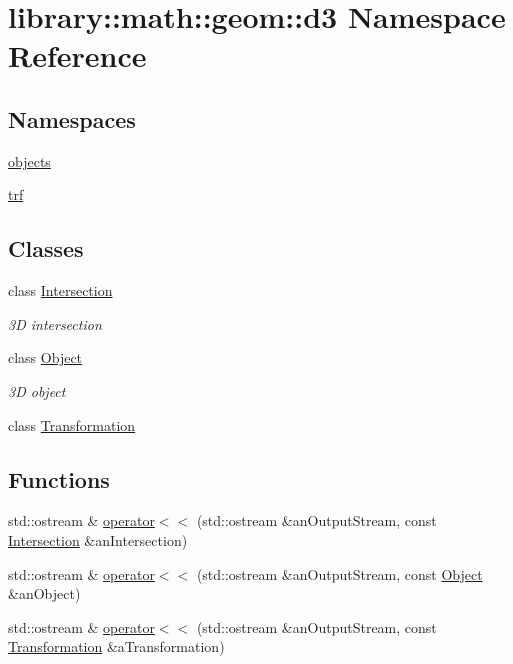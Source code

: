 \hypertarget{namespacelibrary_1_1math_1_1geom_1_1d3}{}\section{library\+:\+:math\+:\+:geom\+:\+:d3 Namespace Reference}
\label{namespacelibrary_1_1math_1_1geom_1_1d3}
\subsection*{Namespaces}
\begin{DoxyCompactItemize}
\item 
 \hyperlink{namespacelibrary_1_1math_1_1geom_1_1d3_1_1objects}{objects}
\item 
 \hyperlink{namespacelibrary_1_1math_1_1geom_1_1d3_1_1trf}{trf}
\end{DoxyCompactItemize}
\subsection*{Classes}
\begin{DoxyCompactItemize}
\item 
class \hyperlink{classlibrary_1_1math_1_1geom_1_1d3_1_1_intersection}{Intersection}
\begin{DoxyCompactList}\small\item\em 3D intersection \end{DoxyCompactList}\item 
class \hyperlink{classlibrary_1_1math_1_1geom_1_1d3_1_1_object}{Object}
\begin{DoxyCompactList}\small\item\em 3D object \end{DoxyCompactList}\item 
class \hyperlink{classlibrary_1_1math_1_1geom_1_1d3_1_1_transformation}{Transformation}
\end{DoxyCompactItemize}
\subsection*{Functions}
\begin{DoxyCompactItemize}
\item 
std\+::ostream \& \hyperlink{namespacelibrary_1_1math_1_1geom_1_1d3_a2fc45a2b6634333d36628dfc09b99cdb}{operator$<$$<$} (std\+::ostream \&an\+Output\+Stream, const \hyperlink{classlibrary_1_1math_1_1geom_1_1d3_1_1_intersection}{Intersection} \&an\+Intersection)
\item 
std\+::ostream \& \hyperlink{namespacelibrary_1_1math_1_1geom_1_1d3_a891f0a129431fdafb0b5a70c32ec181e}{operator$<$$<$} (std\+::ostream \&an\+Output\+Stream, const \hyperlink{classlibrary_1_1math_1_1geom_1_1d3_1_1_object}{Object} \&an\+Object)
\item 
std\+::ostream \& \hyperlink{namespacelibrary_1_1math_1_1geom_1_1d3_af14c56626509ee3737275cc3badb6bc0}{operator$<$$<$} (std\+::ostream \&an\+Output\+Stream, const \hyperlink{classlibrary_1_1math_1_1geom_1_1d3_1_1_transformation}{Transformation} \&a\+Transformation)
\end{DoxyCompactItemize}


